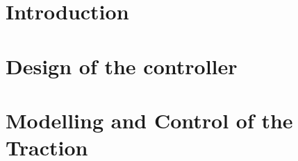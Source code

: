 



\setcounter{page}{2}
\tableofcontents

\hypersetup{allcolors = link}
\chapter{Introduction}


\chapter{Design of the controller}


\chapter{Modelling and Control of the Traction}
\label{chap:traction}



